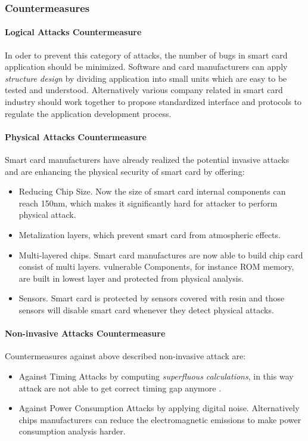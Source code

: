 \subsubsection{Countermeasures}
\paragraph{Logical Attacks Countermeasure}
In oder to prevent this category of attacks, the number of bugs in smart card application should be minimized. Software and card manufacturers can apply \emph{structure design} by dividing application into small units which are easy to be tested and understood. Alternatively various company related in smart card industry should work together to propose standardized interface and protocols to regulate the application development process\cite{smart_card_attack2}.
\paragraph{Physical Attacks Countermeasure}
Smart card manufacturers have already realized the potential  invasive attacks and are enhancing the physical security of smart card by offering:
\begin{itemize}
\item Reducing Chip Size. Now the size of smart card internal components can reach 150nm, which makes it significantly hard for attacker to perform physical attack\cite{smart_card_attack3}.
\item Metalization layers, which prevent smart card from atmospheric effects\cite{smart_card_attack3}.
\item Multi-layered chips. Smart card manufactures are now able to build chip card consist of multi layers. vulnerable Components, for instance ROM memory, are built in lowest layer and protected from physical analysis\cite{smart_card_attack3}. 
\item Sensors.  Smart card is protected by sensors covered with resin and those sensors will disable smart card whenever they detect physical attacks\cite{smart_card_attack}.
\end{itemize}
\paragraph{Non-invasive Attacks Countermeasure}
Countermeasures against above described non-invasive attack are:
\begin{itemize}
\item Against Timing Attacks by computing \emph{superfluous calculations}, in this way attack are not  able  to get correct timing gap anymore\cite{smart_card_attack3} .
\item Against Power Consumption Attacks by applying digital noise. Alternatively chips manufacturers can reduce the electromagnetic emissions to make power consumption analysis  harder\cite{smart_card_attack3}.
\end{itemize}
